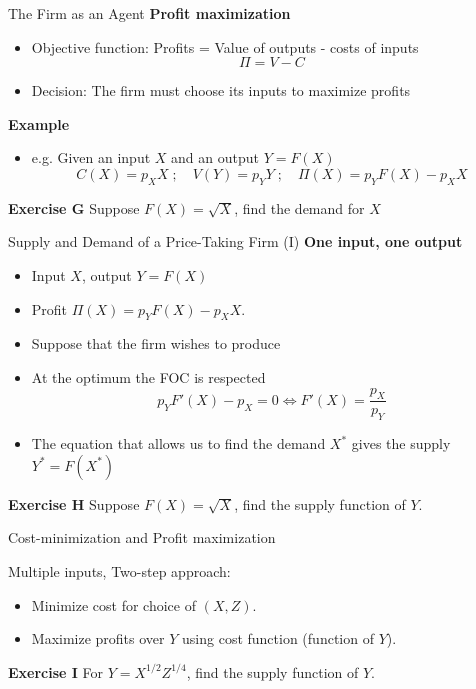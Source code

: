 \documentclass[handout]{beamer}
\newenvironment{iPar}[1]{\textbf{#1} \begin{itemize}}{\end{itemize}}
\newcommand{\mdp}{\medskip \pause}
\begin{document}
\begin{frame}{The Firm as an Agent} \begin{iPar}{Profit maximization} \item Objective function:  Profits = Value of outputs -
costs of inputs $$ \Pi = V - C$$ \item Decision: The firm must choose its inputs to maximize profits \end{iPar} \mdp \begin{iPar}{Example} \item e.g. Given an input $X$ and an output $Y = F(X)$ $$C(X) = p_X X\;;\quad V(Y) = p_Y
Y\;;\quad \Pi(X) = p_Y F(X) - p_XX $$ 
\end{iPar}
\textbf{Exercise G} Suppose $F(X) = \sqrt X$, find the demand for $X$

\end{frame}

\begin{frame}{Supply and Demand of a Price-Taking Firm (I)}
\begin{iPar}{One input, one output} \item  Input $X$, output $Y =
F(X)$  \item Profit $\Pi(X) = p_Y F(X) -
p_XX$.  \item  Suppose that the firm wishes to produce  \item At the optimum the FOC is respected $$ p_Y F'(X) - p_X = 0 \iff F'(X) =
\frac{p_X}{p_Y}$$ \item The equation that allows us to find the demand $X^*$ gives the supply $Y^* = F(X^*)$ \end{iPar}

\textbf{Exercise H} Suppose $F(X) = \sqrt X$, find the supply function of $Y$. 

\end{frame}


\begin{frame}{Cost-minimization and Profit maximization} 

Multiple inputs, Two-step approach: 

\begin{itemize}
    \item Minimize cost for choice of $(X,Z)$. 
    \item Maximize profits over $Y$ using cost function (function of $Y$). 
\end{itemize}

\textbf{Exercise I} For $Y=X^{1/2} Z^{1/4}$, find the supply function of $Y$. 

\end{frame}
\end{document}
